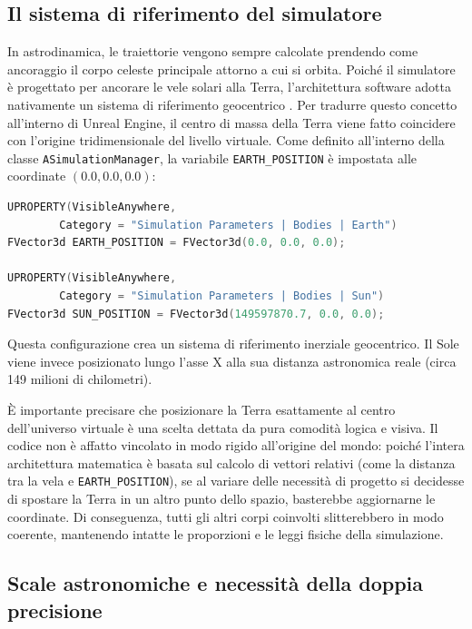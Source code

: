 \subsection{Il sistema di riferimento del simulatore}

In astrodinamica, le traiettorie vengono sempre calcolate prendendo come ancoraggio il corpo celeste principale attorno a cui si orbita. Poiché il simulatore è progettato per ancorare le vele solari alla Terra, l'architettura software adotta nativamente un sistema di riferimento geocentrico \cite{curtis2005orbital}. Per tradurre questo concetto all'interno di Unreal Engine, il centro di massa della Terra viene fatto coincidere con l'origine tridimensionale del livello virtuale. Come definito all'interno della classe \lstinline|ASimulationManager|, la variabile \lstinline|EARTH_POSITION| è impostata alle coordinate $(0.0, 0.0, 0.0)$:

\begin{lstlisting}[language=C++, caption={Definizione delle coordinate centrali in \lstinline|SimulationManager.h|.}]
UPROPERTY(VisibleAnywhere, 
        Category = "Simulation Parameters | Bodies | Earth")
FVector3d EARTH_POSITION = FVector3d(0.0, 0.0, 0.0);

UPROPERTY(VisibleAnywhere,
        Category = "Simulation Parameters | Bodies | Sun")
FVector3d SUN_POSITION = FVector3d(149597870.7, 0.0, 0.0);
\end{lstlisting}

Questa configurazione crea un sistema di riferimento inerziale geocentrico. Il Sole viene invece posizionato lungo l'asse X alla sua distanza astronomica reale (circa 149 milioni di chilometri).

È importante precisare che posizionare la Terra esattamente al centro dell'universo virtuale è una scelta dettata da pura comodità logica e visiva. Il codice non è affatto vincolato in modo rigido all'origine del mondo: poiché l'intera architettura matematica è basata sul calcolo di vettori relativi (come la distanza tra la vela e \lstinline|EARTH_POSITION|), se al variare delle necessità di progetto si decidesse di spostare la Terra in un altro punto dello spazio, basterebbe aggiornarne le coordinate. Di conseguenza, tutti gli altri corpi coinvolti slitterebbero in modo coerente, mantenendo intatte le proporzioni e le leggi fisiche della simulazione.

\subsection{Scale astronomiche e necessità della doppia precisione}

